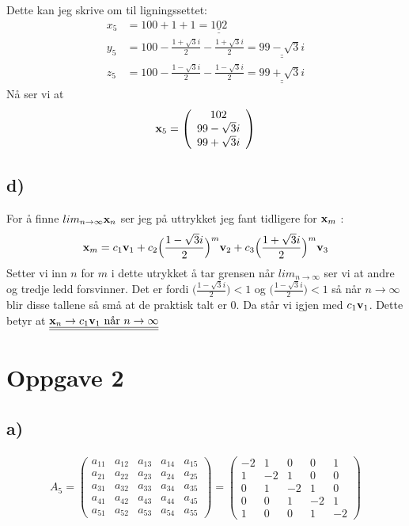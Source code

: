 \documentclass[a4paper,12pt,norsk]{article}
\begin{document}
Dette kan jeg skrive om til ligningssettet:
\begin{align*}
x_5 &= 100 + 1 + 1 = \underline{\underline{102}}\\
y_5 &= 100 - \frac{1+\sqrt{3}i}{2} - \frac{1+\sqrt{3}i}{2} = \underline{\underline{99 - \sqrt{3}i}}\\
z_5 &= 100 - \frac{1-\sqrt{3}i}{2} - \frac{1-\sqrt{3}i}{2} = \underline{\underline{99 + \sqrt{3}i}}
\end{align*}
Nå ser vi at $$\bold{x}_5 = \left({\begin{array}{cc} 102\\ 99 - \sqrt{3}i\\ 99+ \sqrt{3}i  \end{array}}\right)$$

\subsection{d)}
For å finne $lim_{n\rightarrow \infty}\bold{x}_n$ ser jeg på uttrykket jeg fant tidligere for $\bold{x}_m$ :
$$\bold{x}_m=c_1\bold{v}_1 + c_2\Big(\frac{1-\sqrt{3}i}{2}\Big)^m\bold{v}_2 + c_3\Big(\frac{1+\sqrt{3}i}{2}\Big)^m\bold{v}_3$$
Setter vi inn $n$ for $m$ i dette utrykket å tar grensen når $lim_{n\rightarrow \infty}$ ser vi at andre og tredje ledd forsvinner. Det er fordi $\Big(\frac{1-\sqrt{3}i}{2}\Big)<1$ og $\Big(\frac{1-\sqrt{3}i}{2}\Big)<1$ så når $n\rightarrow \infty$ blir disse tallene så små at de praktisk talt er 0. Da står vi igjen med $c_1\bold{v}_1$. Dette betyr at $\underline{\underline{\bold{x}_n \rightarrow c_1\bold{v}_1 \text{ når }n\rightarrow \infty}}$

\section{Oppgave 2}
\subsection{a)}
\begin{align*}
A_5 =
\begin{pmatrix}
a_{11} & a_{12} & a_{13} & a_{14} & a_{15}\\
a_{21} & a_{22} & a_{23} & a_{24} & a_{25}\\
a_{31} & a_{32} & a_{33} & a_{34} & a_{35}\\
a_{41} & a_{42} & a_{43} & a_{44} & a_{45}\\
a_{51} & a_{52} & a_{53} & a_{54} & a_{55}
\end{pmatrix}
=
\begin{pmatrix}
-2 & 1 & 0 & 0 & 1\\
1 & -2 & 1 & 0 & 0\\
0 & 1 & -2 & 1 & 0\\
0 & 0 & 1 & -2 & 1\\
1 & 0 & 0 & 1 & -2
\end{pmatrix}
\end{align*}
\end{document}
